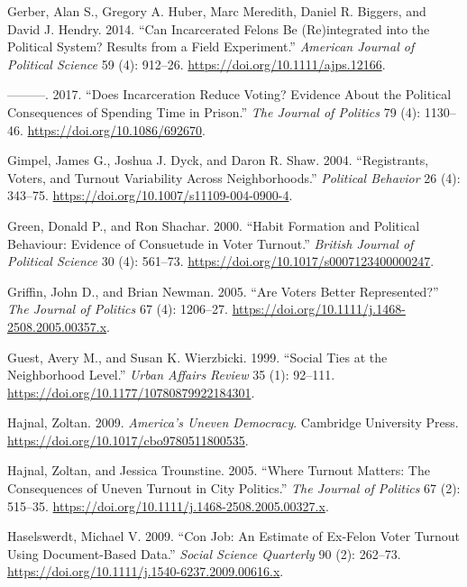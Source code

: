 \documentclass[
  12pt,
]{article}
\newlength{\cslhangindent}
\newenvironment{cslreferences}%
  {\setlength{\parindent}{0pt}%
  \everypar{\setlength{\hangindent}{\cslhangindent}}\ignorespaces}%
  {\par}
\begin{document}
\begin{cslreferences}
\leavevmode\hypertarget{ref-Gerber2014}{}%
Gerber, Alan S., Gregory A. Huber, Marc Meredith, Daniel R. Biggers, and David J. Hendry. 2014. ``Can Incarcerated Felons Be (Re)integrated into the Political System? Results from a Field Experiment.'' \emph{American Journal of Political Science} 59 (4): 912--26. \url{https://doi.org/10.1111/ajps.12166}.

\leavevmode\hypertarget{ref-Gerber2017}{}%
---------. 2017. ``Does Incarceration Reduce Voting? Evidence About the Political Consequences of Spending Time in Prison.'' \emph{The Journal of Politics} 79 (4): 1130--46. \url{https://doi.org/10.1086/692670}.

\leavevmode\hypertarget{ref-Gimpel2004}{}%
Gimpel, James G., Joshua J. Dyck, and Daron R. Shaw. 2004. ``Registrants, Voters, and Turnout Variability Across Neighborhoods.'' \emph{Political Behavior} 26 (4): 343--75. \url{https://doi.org/10.1007/s11109-004-0900-4}.

\leavevmode\hypertarget{ref-Green2000}{}%
Green, Donald P., and Ron Shachar. 2000. ``Habit Formation and Political Behaviour: Evidence of Consuetude in Voter Turnout.'' \emph{British Journal of Political Science} 30 (4): 561--73. \url{https://doi.org/10.1017/s0007123400000247}.

\leavevmode\hypertarget{ref-Griffin2005}{}%
Griffin, John D., and Brian Newman. 2005. ``Are Voters Better Represented?'' \emph{The Journal of Politics} 67 (4): 1206--27. \url{https://doi.org/10.1111/j.1468-2508.2005.00357.x}.

\leavevmode\hypertarget{ref-Guest1999}{}%
Guest, Avery M., and Susan K. Wierzbicki. 1999. ``Social Ties at the Neighborhood Level.'' \emph{Urban Affairs Review} 35 (1): 92--111. \url{https://doi.org/10.1177/10780879922184301}.

\leavevmode\hypertarget{ref-Hajnal2009}{}%
Hajnal, Zoltan. 2009. \emph{America's Uneven Democracy}. Cambridge University Press. \url{https://doi.org/10.1017/cbo9780511800535}.

\leavevmode\hypertarget{ref-Hajnal2005}{}%
Hajnal, Zoltan, and Jessica Trounstine. 2005. ``Where Turnout Matters: The Consequences of Uneven Turnout in City Politics.'' \emph{The Journal of Politics} 67 (2): 515--35. \url{https://doi.org/10.1111/j.1468-2508.2005.00327.x}.

\leavevmode\hypertarget{ref-Haselswerdt2009}{}%
Haselswerdt, Michael V. 2009. ``Con Job: An Estimate of Ex-Felon Voter Turnout Using Document-Based Data.'' \emph{Social Science Quarterly} 90 (2): 262--73. \url{https://doi.org/10.1111/j.1540-6237.2009.00616.x}.


\end{cslreferences}
\end{document}
